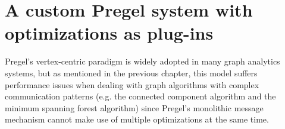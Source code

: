 \documentclass{sokendai_thesis} %
\begin{document}

\chapter{A custom Pregel system with optimizations as plug-ins}
\label{chap:vcgp}

Pregel's vertex-centric paradigm is widely adopted in many graph analytics systems, but as mentioned in the previous chapter, this model suffers performance issues when dealing with graph algorithms with complex communication patterns (e.g. the connected component algorithm and the minimum spanning forest algorithm) since Pregel's monolithic message mechanism cannot make use of multiple optimizations at the same time.
\end{document}
